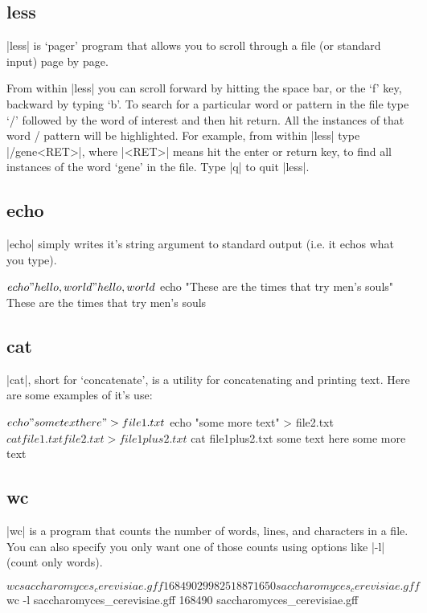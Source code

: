 \subsection{less}

|less| is `pager' program that allows you to scroll through a file (or standard input) page by page.  


From within |less| you can scroll forward by hitting the space bar, or the `f' key, backward by typing `b'. To search for a particular word or pattern in the file type `/' followed by the word of interest and then hit return.  All the instances of that word / pattern will be highlighted. For example, from within |less| type |/gene<RET>|, where |<RET>| means hit the enter or return key, to find all instances of the word `gene' in the file. Type |q| to quit |less|.

\subsection{echo}

|echo| simply writes it's string argument to standard output (i.e. it echos what you type).
\begin{bash}
$ echo "hello, world"
hello, world
$ echo "These are the times that try men's souls"
These are the times that try men's souls    
\end{bash}


\subsection{cat}

|cat|, short for `concatenate', is a utility for concatenating and printing text. Here are some examples of it's use:
\begin{bash}
$ echo "some text here" > file1.txt
$ echo "some more text" > file2.txt
$ cat file1.txt file2.txt > file1plus2.txt
$ cat file1plus2.txt 
some text here
some more text
\end{bash}

\subsection{wc}

|wc| is a program that counts the number of words, lines, and characters in a file.  You can also specify you only want one of those counts using options like |-l| (count only words).
\begin{bash}
$ wc saccharomyces_cerevisiae.gff 
  168490  299825 18871650 saccharomyces_cerevisiae.gff
$ wc -l saccharomyces_cerevisiae.gff 
  168490 saccharomyces_cerevisiae.gff    
\end{bash}

